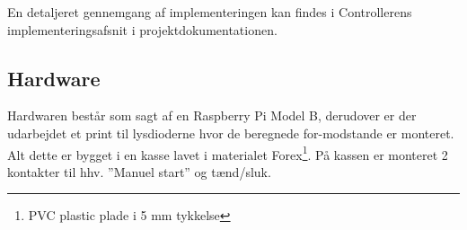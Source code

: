 En detaljeret gennemgang af implementeringen kan findes i Controllerens implementeringsafsnit i projektdokumentationen.

\subsection*{Hardware}

Hardwaren består som sagt af en Raspberry Pi Model B, derudover er der udarbejdet et print til lysdioderne hvor de beregnede for-modstande er monteret. Alt dette er bygget i en kasse lavet i materialet Forex\footnote{PVC plastic plade i 5 mm tykkelse}. På kassen er monteret 2 kontakter til hhv. ''Manuel start'' og tænd/sluk.


